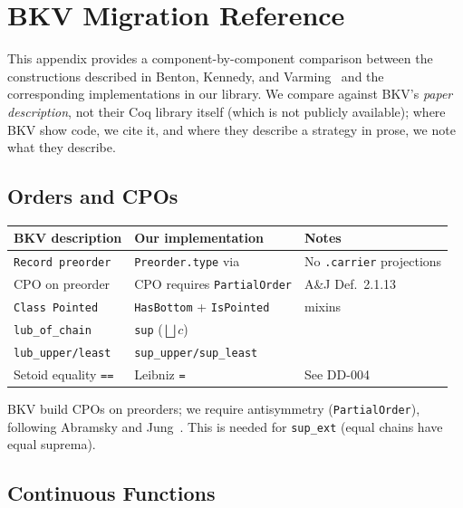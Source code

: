 
\chapter{BKV Migration Reference}
\label{app:bkv-migration}

This appendix provides a component-by-component comparison between the
constructions described in Benton, Kennedy, and
Varming~\cite{BKV2009} and the corresponding implementations in our
library.  We compare against BKV's \emph{paper description}, not their
Coq library itself (which is not publicly available); where BKV show code, we
cite it, and where they describe a strategy in prose, we note what they
describe.

\section*{Orders and CPOs}

\begin{table}[h]
\centering
\small
\begin{tabular}{@{}l l l@{}}
\toprule
\textbf{BKV description} & \textbf{Our implementation} & \textbf{Notes} \\
\midrule
\texttt{Record preorder}    & \texttt{Preorder.type} via \HB{}
  & No \texttt{.carrier} projections \\
CPO on preorder             & CPO requires \texttt{PartialOrder}
  & A\&J Def.\ 2.1.13 \\
\texttt{Class Pointed}      & \texttt{HasBottom} + \texttt{IsPointed}
  & \HB{} mixins \\
\texttt{lub\_of\_chain}     & \texttt{sup} ($\bigsqcup c$)
  & \\
\texttt{lub\_upper/least}   & \texttt{sup\_upper/sup\_least}
  & \\
Setoid equality \texttt{==} & Leibniz \texttt{=}
  & See DD-004 \\
\bottomrule
\end{tabular}
\end{table}

BKV build CPOs on preorders; we require antisymmetry
(\texttt{PartialOrder}), following Abramsky and
Jung~\cite{AJ1994}.  This is needed for \texttt{sup\_ext}
(equal chains have equal suprema).

\section*{Continuous Functions}

